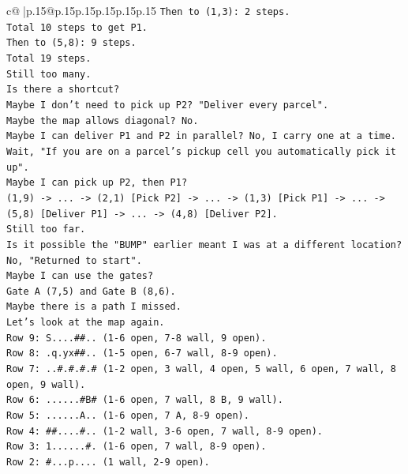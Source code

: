 \documentclass{article}
\begin{document}
{\begin{supertabular}{c@{$\;$}|p{.15\linewidth}@{}p{.15\linewidth}p{.15\linewidth}p{.15\linewidth}p{.15\linewidth}p{.15\linewidth}}
{{{\texttt{Then to (1,3): 2 steps.} \\
\texttt{Total 10 steps to get P1.} \\
\texttt{Then to (5,8): 9 steps.} \\
\texttt{Total 19 steps.} \\
\texttt{Still too many.} \\
\texttt{Is there a shortcut?} \\
\texttt{Maybe I don't need to pick up P2? "Deliver every parcel".} \\
\texttt{Maybe the map allows diagonal? No.} \\
\texttt{Maybe I can deliver P1 and P2 in parallel? No, I carry one at a time.} \\
\texttt{Wait, "If you are on a parcel's pickup cell you automatically pick it up".} \\
\texttt{Maybe I can pick up P2, then P1?} \\
\texttt{(1,9) {-}> ... {-}> (2,1) {[}Pick P2{]} {-}> ... {-}> (1,3) {[}Pick P1{]} {-}> ... {-}> (5,8) {[}Deliver P1{]} {-}> ... {-}> (4,8) {[}Deliver P2{]}.} \\
\texttt{Still too far.} \\
\texttt{Is it possible the "BUMP" earlier meant I was at a different location?} \\
\texttt{No, "Returned to start".} \\
\texttt{Maybe I can use the gates?} \\
\texttt{Gate A (7,5) and Gate B (8,6).} \\
\texttt{Maybe there is a path I missed.} \\
\texttt{Let's look at the map again.} \\
\texttt{Row 9: S....\#\#.. (1{-}6 open, 7{-}8 wall, 9 open).} \\
\texttt{Row 8: .q.yx\#\#.. (1{-}5 open, 6{-}7 wall, 8{-}9 open).} \\
\texttt{Row 7: ..\#.\#.\#.\# (1{-}2 open, 3 wall, 4 open, 5 wall, 6 open, 7 wall, 8 open, 9 wall).} \\
\texttt{Row 6: ......\#B\# (1{-}6 open, 7 wall, 8 B, 9 wall).} \\
\texttt{Row 5: ......A.. (1{-}6 open, 7 A, 8{-}9 open).} \\
\texttt{Row 4: \#\#....\#.. (1{-}2 wall, 3{-}6 open, 7 wall, 8{-}9 open).} \\
\texttt{Row 3: 1......\#. (1{-}6 open, 7 wall, 8{-}9 open).} \\
\texttt{Row 2: \#...p.... (1 wall, 2{-}9 open).} \\
}}}
\end{supertabular}}
\end{document}
